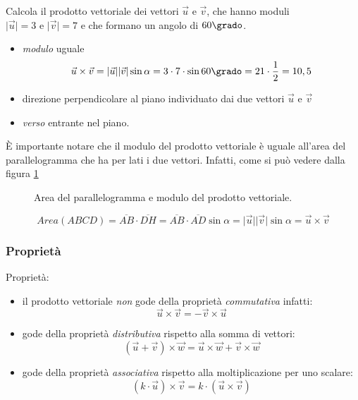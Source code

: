  \begin{esempio}
  Calcola il prodotto vettoriale dei  vettori $\vec{u}$ e $\vec{v}$, 
  che hanno moduli $\lvert\vec{u}\rvert= 3 \text{ e } \lvert\vec{v}\rvert=7$ 
  e che formano un angolo di $60\grado$. 
 \begin{itemize}
  \item \emph{modulo} uguale 
  \[\vec{u} \times \vec{v} = 
    \lvert\vec{u}\rvert\lvert\vec{v}\rvert \sin \alpha=
    3 \cdot 7 \cdot \sin 60\grado = 21 \cdot \frac{1}{2} = 10,5\]
  \item direzione perpendicolare al piano individuato dai due 
   vettori $\vec{u}$ e $\vec{v}$
  \item \emph{verso} entrante nel piano.
 \end{itemize}
 \end{esempio}


\osservazione
È importante notare  che il modulo del prodotto vettoriale è uguale all'area 
del parallelogramma che ha per lati i due vettori.
Infatti, come si può vedere dalla figura \ref{fig:vett_parallelogramma}      

\begin{inaccessibleblock}
 \begin{figure}[h]
 \centering
  
 \caption{Area del parallelogramma e modulo del prodotto vettoriale.}
 \label{fig:vett_parallelogramma}
\end{figure}
\end{inaccessibleblock}

\[Area (ABCD)=\overline{AB} \cdot \overline{DH} =
            \overline{AB} \cdot \overline{AD} \sin \alpha =
            \lvert\vec{u}\rvert\lvert\vec{v}\rvert \sin \alpha=
            \vec{u} \times \vec{v}\]

\subsubsection{Proprietà}

Proprietà:
\begin{itemize}
 \item il prodotto vettoriale \emph{non} gode della proprietà 
  \emph{commutativa} infatti:
  \[\vec{u} \times \vec{v} = - \vec{v} \times \vec{u}\]
 \item gode della proprietà \emph{distributiva} rispetto alla somma di vettori:
  \[\left(\vec{u} + \vec{v} \right) \times \vec{w} = 
    \vec{u} \times \vec{w} + \vec{v} \times \vec{w}\]
 \item gode della proprietà \emph{associativa} rispetto alla moltiplicazione
  per uno scalare:
  \[\left(k \cdot \vec{u} \right) \times \vec{v} = 
    k \cdot \left(\vec{u} \times \vec{v} \right)\]
\end{itemize}

